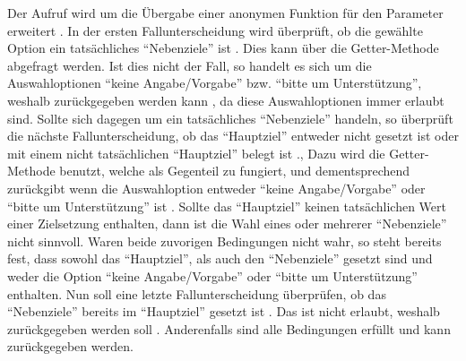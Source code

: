 Der Aufruf  wird um die Übergabe einer anonymen Funktion für den Parameter  erweitert .
In der ersten Fallunterscheidung wird überprüft,
ob die gewählte Option ein tatsächliches \enquote{Nebenziele} ist .
Dies kann über die Getter-Methode  abgefragt werden.
Ist dies nicht der Fall,
so handelt es sich um die Auswahloptionen \enquote{keine Angabe/Vorgabe} bzw. \enquote{bitte um Unterstützung},
weshalb  zurückgegeben werden kann ,
da diese Auswahloptionen immer erlaubt sind.
Sollte sich dagegen um ein tatsächliches \enquote{Nebenziele} handeln,
so überprüft die nächste Fallunterscheidung,
ob das \enquote{Hauptziel} entweder nicht gesetzt ist
oder mit einem nicht tatsächlichen \enquote{Hauptziel} belegt ist .,
Dazu wird die Getter-Methode  benutzt,
welche als Gegenteil zu  fungiert,
und dementsprechend  zurückgibt wenn die Auswahloption entweder \enquote{keine Angabe/Vorgabe} oder \enquote{bitte um Unterstützung} ist .
Sollte das \enquote{Hauptziel} keinen tatsächlichen Wert einer Zielsetzung enthalten,
dann ist die Wahl eines oder mehrerer \enquote{Nebenziele} nicht sinnvoll.
Waren beide zuvorigen Bedingungen nicht wahr,
so steht bereits fest,
dass sowohl das \enquote{Hauptziel},
als auch den \enquote{Nebenziele} gesetzt sind
und weder die Option \enquote{keine Angabe/Vorgabe}
oder \enquote{bitte um Unterstützung} enthalten.
Nun soll eine letzte Fallunterscheidung überprüfen,
ob das \enquote{Nebenziele} bereits im \enquote{Hauptziel} gesetzt ist . 
Das ist nicht erlaubt,
weshalb  zurückgegeben werden soll .
Anderenfalls sind alle Bedingungen erfüllt und  kann zurückgegeben werden.

